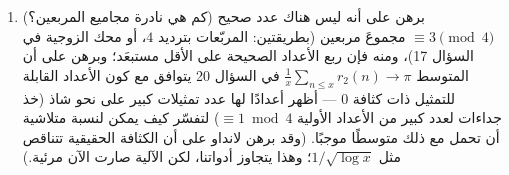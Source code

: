 \begin{problem}
\begin{enumerate}[resume]
\[        \]
        واستنتج --- بإزالة الجزأين الصحيحين بعناية --- متسلسلة
        لايبنتز
        \[
        1 - \frac13 + \frac15 - \frac17 + \dots = \frac\pi4 .
        \]
        فالمتسلسلة المتناوبة لمقلوبات الأعداد الفردية \emph{هي}
        متوسط زيادة القواسم $\equiv 1$ على القواسم $\equiv 3$:
        تحليلٌ يحسبه الحساب.
  \item (كم هي نادرة مجاميع المربعين؟) برهن على أنه ليس هناك عدد
        صحيح $\equiv 3 \pmod 4$ مجموعَ مربعين (بطريقتين: المربّعات بترديد
        $4$، أو محك الزوجية في السؤال 17)، ومنه فإن ربع الأعداد
        الصحيحة على الأقل مستبعَد؛ وبرهن على أن المتوسط $\frac1x\sum_{n\leq
        x}r_2(n) \to \pi$
        في السؤال 20 يتوافق مع كون الأعداد القابلة للتمثيل ذات
        كثافة $0$ --- أظهر أعدادًا لها عدد تمثيلات كبير على نحو
        شاذ (خذ جداءات لعدد كبير من الأعداد الأولية $\equiv 1 \bmod 4$)
        لتفسّر كيف يمكن لنسبة متلاشية أن تحمل مع ذلك متوسطًا
        موجبًا. (وقد برهن لانداو على أن الكثافة الحقيقية تتناقص
        مثل $1/\sqrt{\log x}$؛ وهذا يتجاوز أدواتنا، لكن الآلية صارت الآن
        مرئية.)
\end{enumerate}


\end{problem}
